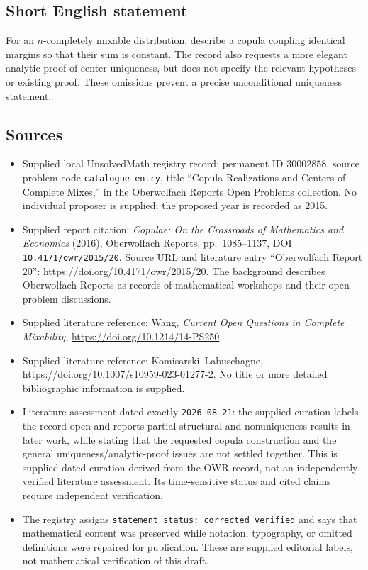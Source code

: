 \documentclass[11pt]{article}
\begin{document}
\subsection{Short English statement}
For an \(n\)-completely mixable distribution, describe a copula coupling identical margins so that their sum is constant. The record also requests a more elegant analytic proof of center uniqueness, but does not specify the relevant hypotheses or existing proof. These omissions prevent a precise unconditional uniqueness statement.
\subsection{Sources}
\begin{itemize}
\item Supplied local UnsolvedMath registry record: permanent ID \(30002858\), source problem code \texttt{catalogue entry}, title ``Copula Realizations and Centers of Complete Mixes,'' in the Oberwolfach Reports Open Problems collection. No individual proposer is supplied; the proposed year is recorded as 2015.
\item Supplied report citation: \emph{Copulae: On the Crossroads of Mathematics and Economics} (2016), Oberwolfach Reports, pp.\ 1085--1137, DOI \texttt{10.4171/owr/2015/20}. Source URL and literature entry ``Oberwolfach Report 20'': \url{https://doi.org/10.4171/owr/2015/20}. The background describes Oberwolfach Reports as records of mathematical workshops and their open-problem discussions.
\item Supplied literature reference: Wang, \emph{Current Open Questions in Complete Mixability}, \url{https://doi.org/10.1214/14-PS250}.
\item Supplied literature reference: Komisarski--Labuschagne, \url{https://doi.org/10.1007/s10959-023-01277-2}. No title or more detailed bibliographic information is supplied.
\item Literature assessment dated exactly \texttt{2026-08-21}: the supplied curation labels the record open and reports partial structural and nonuniqueness results in later work, while stating that the requested copula construction and the general uniqueness/analytic-proof issues are not settled together. This is supplied dated curation derived from the OWR record, not an independently verified literature assessment. Its time-sensitive status and cited claims require independent verification.
\item The registry assigns \texttt{statement\_status: corrected\_verified} and says that mathematical content was preserved while notation, typography, or omitted definitions were repaired for publication. These are supplied editorial labels, not mathematical verification of this draft.
\end{itemize}
\end{document}
